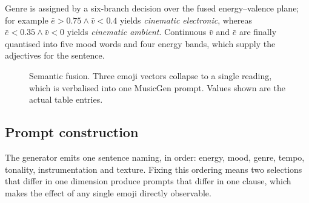 \documentclass[11pt]{article}
\begin{document}
Genre is assigned by a six-branch decision over the fused energy--valence
plane; for example $\bar{e}>0.75 \wedge \bar{v}<0.4$ yields
\emph{cinematic electronic}, whereas $\bar{e}<0.35 \wedge \bar{v}<0$ yields
\emph{cinematic ambient}. Continuous $\bar{v}$ and $\bar{e}$ are finally
quantised into five mood words and four energy bands, which supply the
adjectives for the sentence.

\begin{figure}[htbp]
\centering
{}
\caption{Semantic fusion. Three emoji vectors collapse to a single reading,
which is verbalised into one MusicGen prompt. Values shown are the actual
table entries.}
\label{fig:fusion}
\end{figure}

\subsection{Prompt construction}
The generator emits one sentence naming, in order: energy, mood, genre,
tempo, tonality, instrumentation and texture. Fixing this ordering means two
selections that differ in one dimension produce prompts that differ in one
clause, which makes the effect of any single emoji directly observable.
\end{document}
